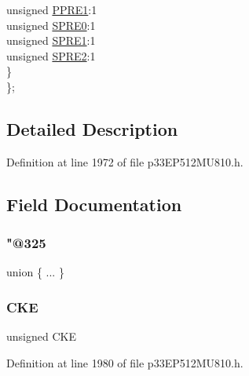 \begin{DoxyCompactItemize}
\begin{tabbing}
\>\>unsigned \hyperlink{structtag_s_p_i2_c_o_n1_b_i_t_s_aa3b2b2be41d5f1c2cbb3d719899ec64b}{PPRE1}:1\\
\>\>unsigned \hyperlink{structtag_s_p_i2_c_o_n1_b_i_t_s_a36cb065bf6e87533eeb108f0f5383f6c}{SPRE0}:1\\
\>\>unsigned \hyperlink{structtag_s_p_i2_c_o_n1_b_i_t_s_aa10bf0541cfc6de804735f5e3beca089}{SPRE1}:1\\
\>\>unsigned \hyperlink{structtag_s_p_i2_c_o_n1_b_i_t_s_ad98c0587f19b608e8e40e67d2327634c}{SPRE2}:1\\
\>\} \\
\}; \\

\end{tabbing}\end{DoxyCompactItemize}


\subsection{Detailed Description}


Definition at line 1972 of file p33\+E\+P512\+M\+U810.\+h.



\subsection{Field Documentation}
\mbox{\label{structtag_s_p_i2_c_o_n1_b_i_t_s_a36d8102966edb714455e828df75ce037}} 
\subsubsection{\texorpdfstring{"@325}{@325}}
{\footnotesize\ttfamily union \{ ... \} }

\mbox{\label{structtag_s_p_i2_c_o_n1_b_i_t_s_ad6e30ba11b5574f8a5f548a818b64186}} 
\subsubsection{\texorpdfstring{C\+KE}{CKE}}
{\footnotesize\ttfamily unsigned C\+KE}



Definition at line 1980 of file p33\+E\+P512\+M\+U810.\+h.

